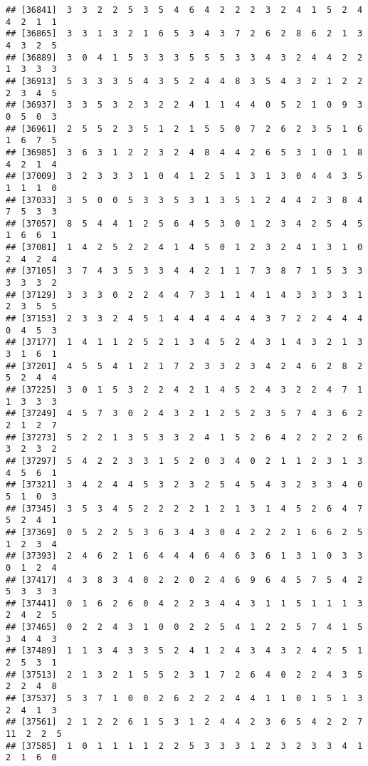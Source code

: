 \documentclass[
]{article}
\begin{document}
\begin{verbatim}
## [36841]  3  3  2  2  5  3  5  4  6  4  2  2  2  3  2  4  1  5  2  4  4  2  1  1
## [36865]  3  3  1  3  2  1  6  5  3  4  3  7  2  6  2  8  6  2  1  3  4  3  2  5
## [36889]  3  0  4  1  5  3  3  3  5  5  5  3  3  4  3  2  4  4  2  2  1  3  3  3
## [36913]  5  3  3  3  5  4  3  5  2  4  4  8  3  5  4  3  2  1  2  2  2  3  4  5
## [36937]  3  3  5  3  2  3  2  2  4  1  1  4  4  0  5  2  1  0  9  3  0  5  0  3
## [36961]  2  5  5  2  3  5  1  2  1  5  5  0  7  2  6  2  3  5  1  6  1  6  7  5
## [36985]  3  6  3  1  2  2  3  2  4  8  4  4  2  6  5  3  1  0  1  8  4  2  1  4
## [37009]  3  2  3  3  3  1  0  4  1  2  5  1  3  1  3  0  4  4  3  5  1  1  1  0
## [37033]  3  5  0  0  5  3  3  5  3  1  3  5  1  2  4  4  2  3  8  4  7  5  3  3
## [37057]  8  5  4  4  1  2  5  6  4  5  3  0  1  2  3  4  2  5  4  5  1  6  6  1
## [37081]  1  4  2  5  2  2  4  1  4  5  0  1  2  3  2  4  1  3  1  0  2  4  2  4
## [37105]  3  7  4  3  5  3  3  4  4  2  1  1  7  3  8  7  1  5  3  3  3  3  3  2
## [37129]  3  3  3  0  2  2  4  4  7  3  1  1  4  1  4  3  3  3  3  1  2  3  5  5
## [37153]  2  3  3  2  4  5  1  4  4  4  4  4  4  3  7  2  2  4  4  4  0  4  5  3
## [37177]  1  4  1  1  2  5  2  1  3  4  5  2  4  3  1  4  3  2  1  3  3  1  6  1
## [37201]  4  5  5  4  1  2  1  7  2  3  3  2  3  4  2  4  6  2  8  2  5  2  4  4
## [37225]  3  0  1  5  3  2  2  4  2  1  4  5  2  4  3  2  2  4  7  1  1  3  3  3
## [37249]  4  5  7  3  0  2  4  3  2  1  2  5  2  3  5  7  4  3  6  2  2  1  2  7
## [37273]  5  2  2  1  3  5  3  3  2  4  1  5  2  6  4  2  2  2  2  6  3  2  3  2
## [37297]  5  4  2  2  3  3  1  5  2  0  3  4  0  2  1  1  2  3  1  3  4  5  6  1
## [37321]  3  4  2  4  4  5  3  2  3  2  5  4  5  4  3  2  3  3  4  0  5  1  0  3
## [37345]  3  5  3  4  5  2  2  2  2  1  2  1  3  1  4  5  2  6  4  7  5  2  4  1
## [37369]  0  5  2  2  5  3  6  3  4  3  0  4  2  2  2  1  6  6  2  5  1  2  3  4
## [37393]  2  4  6  2  1  6  4  4  4  6  4  6  3  6  1  3  1  0  3  3  0  1  2  4
## [37417]  4  3  8  3  4  0  2  2  0  2  4  6  9  6  4  5  7  5  4  2  5  3  3  3
## [37441]  0  1  6  2  6  0  4  2  2  3  4  4  3  1  1  5  1  1  1  3  2  4  2  5
## [37465]  0  2  2  4  3  1  0  0  2  2  5  4  1  2  2  5  7  4  1  5  3  4  4  3
## [37489]  1  1  3  4  3  3  5  2  4  1  2  4  3  4  3  2  4  2  5  1  2  5  3  1
## [37513]  2  1  3  2  1  5  5  2  3  1  7  2  6  4  0  2  2  4  3  5  2  2  4  8
## [37537]  5  3  7  1  0  0  2  6  2  2  2  4  4  1  1  0  1  5  1  3  2  4  1  3
## [37561]  2  1  2  2  6  1  5  3  1  2  4  4  2  3  6  5  4  2  2  7 11  2  2  5
## [37585]  1  0  1  1  1  1  2  2  5  3  3  3  1  2  3  2  3  3  4  1  2  1  6  0

\end{verbatim}
\end{document}
